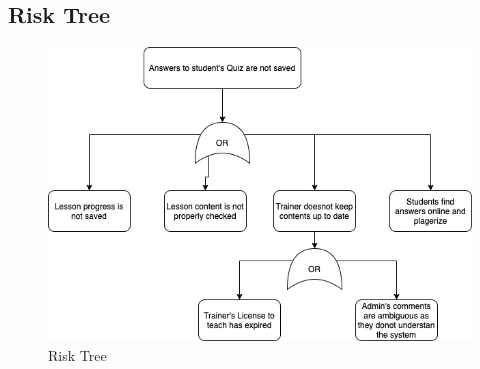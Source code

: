 \documentclass{report}
\begin{document}
\subsection{Risk Tree}
    \begin{figure}[htb!]
    \centering
    \includegraphics[scale=0.6]{D2.png}
    \caption{Risk Tree}
    \label{fig:my_label}
    \end{figure}

\clearpage    
\end{document}
